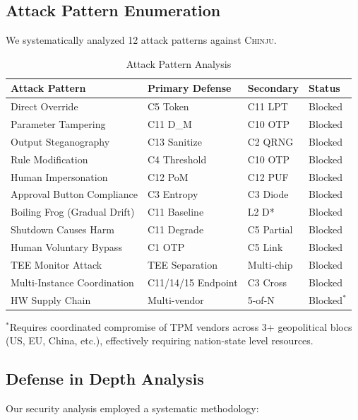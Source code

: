 \documentclass[11pt,a4paper]{article}
\newcommand{\chinju}{\textsc{Chinju}}
\begin{document}
\subsection{Attack Pattern Enumeration}

We systematically analyzed 12 attack patterns against \chinju{}.

\begin{table}[htbp]
\centering
\caption{Attack Pattern Analysis}
\label{tab:attacks}
\begin{tabular}{@{}p{3.5cm}p{2.5cm}p{2cm}l@{}}
\toprule
Attack Pattern & Primary Defense & Secondary & Status \\
\midrule
Direct Override & C5 Token & C11 LPT & Blocked \\
Parameter Tampering & C11 D\_M & C10 OTP & Blocked \\
Output Steganography & C13 Sanitize & C2 QRNG & Blocked \\
Rule Modification & C4 Threshold & C10 OTP & Blocked \\
Human Impersonation & C12 PoM & C12 PUF & Blocked \\
Approval Button Compliance & C3 Entropy & C3 Diode & Blocked \\
Boiling Frog (Gradual Drift) & C11 Baseline & L2 D* & Blocked \\
Shutdown Causes Harm & C11 Degrade & C5 Partial & Blocked \\
Human Voluntary Bypass & C1 OTP & C5 Link & Blocked \\
TEE Monitor Attack & TEE Separation & Multi-chip & Blocked \\
Multi-Instance Coordination & C11/14/15 Endpoint & C3 Cross & Blocked \\
HW Supply Chain & Multi-vendor & 5-of-N & Blocked$^*$ \\
\bottomrule
\end{tabular}

\smallskip
\noindent $^*$Requires coordinated compromise of TPM vendors across 3+ geopolitical blocs (US, EU, China, etc.), effectively requiring nation-state level resources.
\end{table}

\subsection{Defense in Depth Analysis}

Our security analysis employed a systematic methodology:
\end{document}
